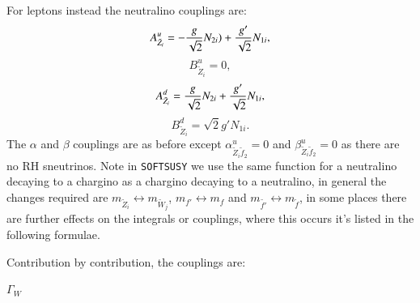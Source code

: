 \documentclass[final,3p,times]{elsarticle}
\begin{document}
For leptons instead the neutralino couplings are:
\begin{equation}
A_{\tilde{Z}_i}^{u} = -{g \over \sqrt{2}}N_{2i}) + {g' \over \sqrt{2}}N_{1i},
\end{equation}
\begin{equation}
B_{\tilde{Z}_i}^{u} = 0,
\end{equation}
\begin{equation}
A_{\tilde{Z}_{i}}^{d} = {g \over \sqrt{2}}N_{2i} + {g' \over \sqrt{2}}N_{1i},
\end{equation}
\begin{equation}
B_{\tilde{Z}_{i}}^{d} = \sqrt{2} g' N_{1i}.
\end{equation}
The $\alpha$ and $\beta$ couplings are as before except $\alpha_{\tilde{Z}_{i} \tilde{f}_2}^{u} = 0$ and $\beta_{\tilde{Z}_{i} \tilde{f}_2}^{u} = 0$ as there are no RH sneutrinos.
Note in {\tt {\tt SOFTSUSY}} we use the same function for a neutralino decaying to a chargino as a chargino decaying to a neutralino, in general the changes required are $m_{\tilde{Z}_i} \leftrightarrow m_{\tilde{W}_j}$, $m_{f'} \leftrightarrow m_{f}$ and $m_{\tilde{f'}} \leftrightarrow m_{\tilde{f}}$, in some places there are further effects on the integrals or couplings, where this occurs it's listed in the following formulae.

Contribution by contribution, the couplings are:

\textbf{\underline{$\Gamma_{W}$}}
\end{document}
